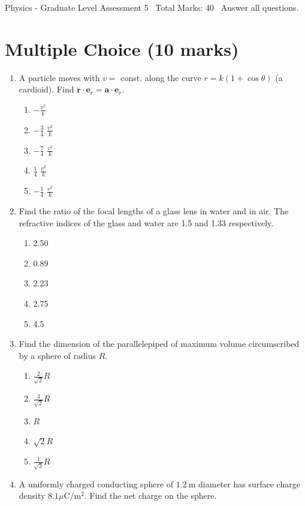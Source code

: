 \documentclass[12pt]{article}
\begin{document}
\begin{center}
Physics - Graduate Level Assessment 5 \
Total Marks: 40 \
Answer all questions.
\end{center}

\section*{Multiple Choice (10 marks)}
\begin{enumerate}[label=\arabic*.]
\item A particle moves with $v=$ const. along the curve $r=k(1+\cos \theta)$ (a cardioid). Find $\ddot{\mathbf{r}} \cdot \mathbf{e}_r=\mathbf{a} \cdot \mathbf{e}_r$.
\begin{enumerate}[label=(\alph*)]
    \item $-\frac{v^2}{k}$
    \item $-\frac{3}{4}$ $\frac{v^2}{k}$
    \item $-\frac{7}{4}$ $\frac{v^2}{k}$
    \item $\frac{1}{4}$ $\frac{v^2}{k}$
    \item $-\frac{1}{4}$ $\frac{v^2}{k}$
\end{enumerate}
\item Find the ratio of the focal lengths of a glass lens in water and in air. The refractive indices of the glass and water are 1.5 and 1.33 respectively.
\begin{enumerate}[label=(\alph*)]
    \item 2.50
    \item 0.89
    \item 2.23
    \item 2.75
    \item 4.5
\end{enumerate}
\item Find the dimension of the parallelepiped of maximum volume circumscribed by a sphere of radius $R$.
\begin{enumerate}[label=(\alph*)]
    \item $\frac{2}{\sqrt{2}}R$
    \item $\frac{3}{\sqrt{2}}R$
    \item $R$
    \item $\sqrt{2}R$
    \item $\frac{1}{\sqrt{3}}R$
\end{enumerate}
\item A uniformly charged conducting sphere of $1.2 \mathrm{~m}$ diameter has surface charge density $8.1 \mu \mathrm{C} / \mathrm{m}^2$. Find the net charge on the sphere.

\end{enumerate}
\end{document}
